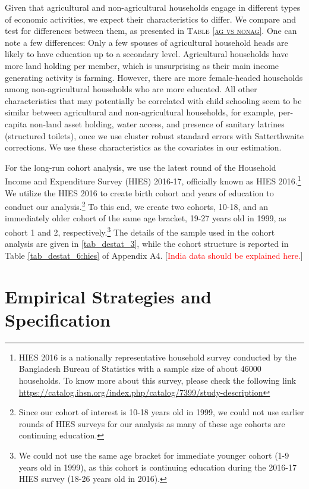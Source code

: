 \documentclass[12pt,letterpaper]{article}
\newcommand{\SAdded}[1]{\textcolor{red}{#1}}
\newcommand{\0}{\ensuremath{\mbox{\boldmath $0$}}}
\begin{document}
Given that agricultural and non-agricultural households engage in different types of economic activities, we expect their characteristics to differ. We compare and test for differences between them, as presented in \textsc{\small Table \ref{ag vs nonag}}. One can note a few differences: Only a few spouses of agricultural household heads are likely to have education up to a secondary level. Agricultural households have more land holding per member, which is unsurprising as their main income generating activity is farming. However, there are more female-headed households among non-agricultural households who are more educated. All other characteristics that may potentially be correlated with child schooling seem to be similar between agricultural and non-agricultural households, for example, per-capita non-land asset holding, water access, and presence of sanitary latrines (structured toilets), once we use cluster robust standard errors with Satterthwaite corrections. We use these characteristics as the covariates in our estimation. 

For the long-run cohort analysis, we use the latest round of the Household Income and Expenditure Survey (HIES) 2016-17, officially known as HIES 2016.\footnote{HIES 2016 is a nationally representative household survey conducted by the Bangladesh Bureau of Statistics with a sample size of about 46000 households. To know more about this survey, please check the following link \url{https://catalog.ihsn.org/index.php/catalog/7399/study-description}} We utilize the HIES 2016 to create birth cohort and years of education to conduct our analysis.\footnote{Since our cohort of interest is 10-18 years old in 1999, we could not use earlier rounds of HIES surveys for our analysis as many of these age cohorts are continuing education.} To this end, we create two cohorts, 10-18, and an immediately older cohort of the same age bracket, 19-27 years old in 1999, as cohort 1 and 2, respectively.\footnote{We could not use the same age bracket for immediate younger cohort (1-9 years old in 1999), as this cohort is continuing education during the 2016-17 HIES survey (18-26 years old in 2016).} The details of the sample used in the cohort analysis are given in \ref{tab_destat_3}, while the cohort structure is reported in Table \ref{tab_destat_6:hies} of Appendix A4.  [\SAdded{India data should be explained here.}]



\section{Empirical Strategies and Specification}\label{sec_empirical}
\end{document}
